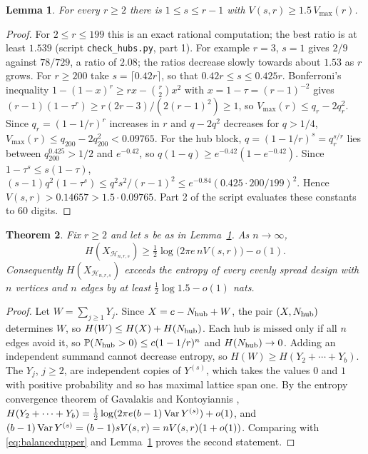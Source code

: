 \documentclass[11pt,a4paper]{article}
\newtheorem{theorem}{Theorem}[section]\newtheorem{lemma}[theorem]{Lemma}\newtheorem{proposition}[theorem]{Proposition}\newtheorem{corollary}[theorem]{Corollary}
\theoremstyle{definition}\newtheorem{remark}[theorem]{Remark}\newtheorem{conjecture}{Conjecture}
\begin{document}
\begin{lemma}\label{lem:hubgap}
For every $r\ge2$ there is $1\le s\le r-1$ with $V(s,r)\ge1.5\,V_{\max}(r)$.
\end{lemma}
\begin{proof}
For $2\le r\le199$ this is an exact rational computation; the best ratio is at least $1.539$ (script \texttt{check\_hubs.py}, part 1). For example $r=3$, $s=1$ gives $2/9$ against $78/729$, a ratio of $2.08$; the ratios decrease slowly towards about $1.53$ as $r$ grows. For $r\ge200$ take $s=\lceil0.42r\rceil$, so that $0.42r\le s\le0.425r$. Bonferroni's inequality $1-(1-x)^r\ge rx-\binom r2x^2$ with $x=1-\tau=(r-1)^{-2}$ gives $(r-1)(1-\tau^r)\ge r(2r-3)/(2(r-1)^2)\ge1$, so $V_{\max}(r)\le q_r-2q_r^2$. Since $q_r=(1-1/r)^r$ increases in $r$ and $q-2q^2$ decreases for $q>1/4$, $V_{\max}(r)\le q_{200}-2q_{200}^2<0.09765$. For the hub block, $q=(1-1/r)^s=q_r^{s/r}$ lies between $q_{200}^{0.425}>1/2$ and $e^{-0.42}$, so $q(1-q)\ge e^{-0.42}(1-e^{-0.42})$. Since $1-\tau^s\le s(1-\tau)$, $(s-1)q^2(1-\tau^s)\le q^2s^2/(r-1)^2\le e^{-0.84}(0.425\cdot200/199)^2$. Hence $V(s,r)>0.14657>1.5\cdot0.09765$. Part 2 of the script evaluates these constants to $60$ digits.
\end{proof}

\begin{theorem}\label{thm:hubs}
Fix $r\ge2$ and let $s$ be as in Lemma~\ref{lem:hubgap}. As $n\to\infty$,
\[
H(X_{\mathcal H_{n,r,s}})\ge\tfrac12\log\big(2\pi e\,nV(s,r)\big)-o(1).
\]
Consequently $H(X_{\mathcal H_{n,r,s}})$ exceeds the entropy of every evenly spread design with $n$ vertices and $n$ edges by at least $\tfrac12\log1.5-o(1)$ nats.
\end{theorem}
\begin{proof}
Let $W=\sum_{j\ge1}Y_j$. Since $X=c-N_{\rm hub}+W$, the pair $(X,N_{\rm hub})$ determines $W$, so $H(W)\le H(X)+H(N_{\rm hub})$. Each hub is missed only if all $n$ edges avoid it, so $\mathbb P(N_{\rm hub}>0)\le c(1-1/r)^n$ and $H(N_{\rm hub})\to0$. Adding an independent summand cannot decrease entropy, so $H(W)\ge H(Y_2+\cdots+Y_b)$. The $Y_j$, $j\ge2$, are independent copies of $Y^{(s)}$, which takes the values $0$ and $1$ with positive probability and so has maximal lattice span one. By the entropy convergence theorem of Gavalakis and Kontoyiannis \cite[Theorem~1.1]{gk},
$H(Y_2+\cdots+Y_b)=\tfrac12\log(2\pi e(b-1)\operatorname{Var} Y^{(s)})+o(1)$, and $(b-1)\operatorname{Var} Y^{(s)}=(b-1)sV(s,r)=nV(s,r)(1+o(1))$. Comparing with \eqref{eq:balancedupper} and Lemma~\ref{lem:hubgap} proves the second statement.
\end{proof}
\end{document}
